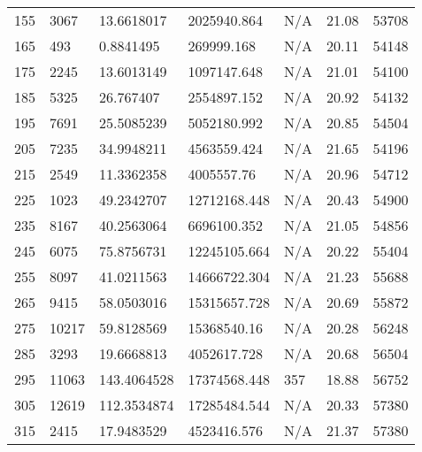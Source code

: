 \begin{tabular}{lllllll}
155  & 3067            & 13.6618017     & 2025940.864      & N/A            & 21.08         & 53708           \\
165  & 493             & 0.8841495      & 269999.168       & N/A            & 20.11         & 54148           \\
175  & 2245            & 13.6013149     & 1097147.648      & N/A            & 21.01         & 54100           \\
185  & 5325            & 26.767407      & 2554897.152      & N/A            & 20.92         & 54132           \\
195  & 7691            & 25.5085239     & 5052180.992      & N/A            & 20.85         & 54504           \\
205  & 7235            & 34.9948211     & 4563559.424      & N/A            & 21.65         & 54196           \\
215  & 2549            & 11.3362358     & 4005557.76       & N/A            & 20.96         & 54712           \\
225  & 1023            & 49.2342707     & 12712168.448     & N/A            & 20.43         & 54900           \\
235  & 8167            & 40.2563064     & 6696100.352      & N/A            & 21.05         & 54856           \\
245  & 6075            & 75.8756731     & 12245105.664     & N/A            & 20.22         & 55404           \\
255  & 8097            & 41.0211563     & 14666722.304     & N/A            & 21.23         & 55688           \\
265  & 9415            & 58.0503016     & 15315657.728     & N/A            & 20.69         & 55872           \\
275  & 10217           & 59.8128569     & 15368540.16      & N/A            & 20.28         & 56248           \\
285  & 3293            & 19.6668813     & 4052617.728      & N/A            & 20.68         & 56504           \\
295  & 11063           & 143.4064528    & 17374568.448     & 357            & 18.88         & 56752           \\
305  & 12619           & 112.3534874    & 17285484.544     & N/A            & 20.33         & 57380           \\
315  & 2415            & 17.9483529     & 4523416.576      & N/A            & 21.37         & 57380           \\

\end{tabular}
